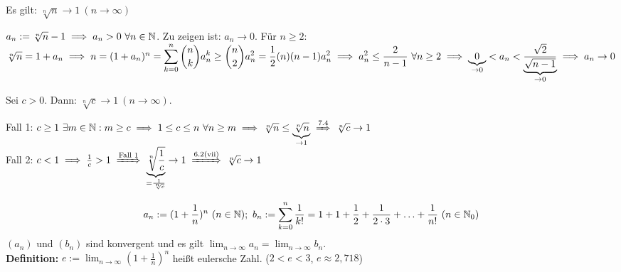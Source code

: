 \documentclass[a4paper,twoside,DIV15,BCOR12mm]{scrbook}
\begin{document}
\begin{satz}
Es gilt: $\sqrt[n]{n} \to 1 \ (n \to \infty)$
\end{satz}

\begin{beweis}
$a_n := \sqrt[n]{n} -1 \folgt a_n > 0 \ \forall n \in\MdN$. Zu zeigen ist: $a_n \to 0$. Für $n \ge 2$: $\sqrt[n]{n} = 1 + a_n \implies n = (1+a_n)^n = \displaystyle\sum_{k=0}^n \binom{n}{k}a_n^k \ge \binom{n}{2}a_n^2 = \frac{1}{2}(n)(n-1)a_n^2 \implies a_n^2 \le \frac{2}{n-1} \ \forall n\ge 2 \implies \underbrace{0}_{\to 0} < a_n < \underbrace{\frac{\sqrt{2}}{\sqrt{n-1}}}_{\to 0} \implies a_n \to 0$
\end{beweis}

\begin{wichtigesbeispiel}
Sei $c>0$. Dann: $\sqrt[n]{c} \to 1 \ (n\to\infty)$.
\end{wichtigesbeispiel}

\begin{beweis} 
Fall 1: $c\ge 1 \ \exists m \in\MdN: m \ge c \folgt 1\le c\le n \ \forall n\ge m \folgt \sqrt[n]{n} \le \underbrace{\sqrt[n]{n}}_{\to 1} \folgtnach{7.4} \sqrt[n]{c} \to 1$ \\
Fall 2: $c<1 \folgt \frac{1}{c} > 1 \folgtnach{Fall 1} \underbrace{\sqrt[n]{\frac{1}{c}}}_{=\frac{1}{\sqrt[n]{c}}} \to 1 \folgtnach{6.2(vii)} \sqrt[n]{c} \to 1$
\end{beweis}

\begin{satz}
$$a_n := (1+\frac{1}{n})^n \ (n\in\MdN);\ b_n := \displaystyle\sum_{k=0}^n \frac{1}{k!} = 1 + 1 + \frac{1}{2} + \frac{1}{2\cdot3}+ \ldots + \frac{1}{n!}\ (n\in\MdN_0)$$
$(a_n)$ und $(b_n)$ sind konvergent und es gilt $\displaystyle\lim_{n\to\infty} a_n = \displaystyle\lim_{n\to\infty} b_n$.\\
\textbf{Definition:} $e := \displaystyle\lim_{n\to\infty} (1+\frac{1}{n})^n$ heißt eulersche Zahl. ($2<e<3$, $e\approx 2,718$)
\end{satz}
\end{document}
